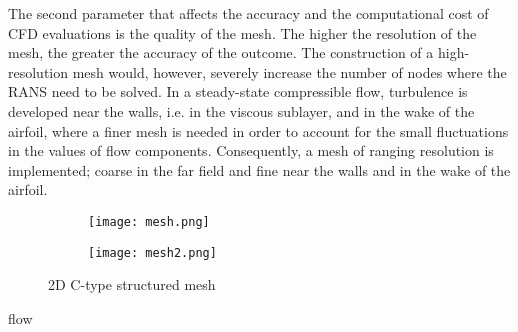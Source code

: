 The second parameter that affects the accuracy and the 
computational cost of CFD evaluations is the quality of the mesh.
The higher the resolution of the mesh, the greater the accuracy of 
the outcome. The construction of a high-resolution mesh would, 
however, severely increase the number of nodes where the RANS need 
to be solved. In a steady-state compressible flow, turbulence is 
developed near the walls, i.e. in the viscous sublayer, and in the 
wake of the airfoil, where a finer mesh is needed in order to 
account for the small fluctuations in the values of flow 
components. Consequently, a mesh of ranging resolution is 
implemented; coarse in the far field and fine near the walls and 
in the wake of the airfoil. 

\newpage

\begin{figure}[h!]
\centering
	\begin{subfigure}[b]{0.49\textwidth}
	\centering
	\texttt{[image: mesh.png]}   
	\end{subfigure}
	\hfill
	\begin{subfigure}[b]{0.49\textwidth}
	\centering
	\texttt{[image: mesh2.png]}   
	\end{subfigure}
\caption{2D C-type structured mesh} 
\label{fig:mesh}
\end{figure}

flow 

